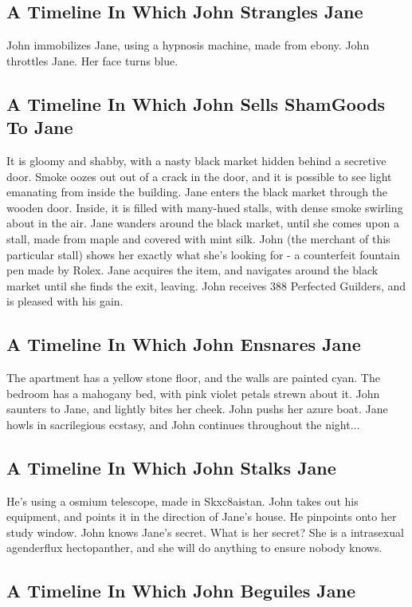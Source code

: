 \documentclass{article}
\begin{document}
\subsection{A Timeline In Which John Strangles Jane}


John immobilizes Jane, using a hypnosis machine, made from ebony.
John throttles Jane.
Her face turns blue.
\subsection{A Timeline In Which John Sells ShamGoods To Jane}


It is gloomy and shabby, with a nasty black market hidden behind a secretive door.
Smoke oozes out out of a crack in the door, and it is possible to see light emanating from inside the building.
Jane enters the black market through the wooden door.
Inside, it is filled with many{-}hued stalls, with dense smoke swirling about in the air.
Jane wanders around the black market, until she comes upon a stall, made from maple and covered with mint silk.
John (the merchant of this particular stall) shows her exactly what she's looking for {-} a counterfeit fountain pen made by Rolex.
Jane acquires the item, and navigates around the black market until she finds the exit, leaving.
John receives 388 Perfected Guilders, and is pleased with his gain.
\subsection{A Timeline In Which John Ensnares Jane}


The apartment has a yellow stone floor, and the walls are painted cyan.
The bedroom has a mahogany bed, with pink violet petals strewn about it.
John saunters to Jane, and lightly bites her cheek.
John pushs her azure boat.
Jane howls in sacrilegious ecstasy, and John continues throughout the night...
\subsection{A Timeline In Which John Stalks Jane}


He's using a osmium telescope, made in Skxc8aistan.
John takes out his equipment, and points it in the direction of Jane's house. He pinpoints onto her study window.
John knows Jane's secret. What is her secret? She is a intrasexual agenderflux hectopanther, and she will do anything to ensure nobody knows.
\subsection{A Timeline In Which John Beguiles Jane}
\end{document}
